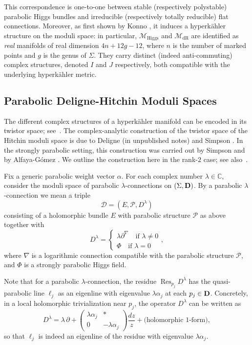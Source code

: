 \documentclass[12pt,a4paper]{amsart}
\theoremstyle{definition}
\theoremstyle{remark}
\newcommand{\C}{\mathbb C}
\newcommand{\Mcal}{\mathcal M}
\newcommand{\Pcal}{\mathcal P}
\begin{document}
This correspondence is one-to-one between stable (respectively polystable) parabolic Higgs bundles and irreducible (respectively totally reducible) flat connections.
Moreover, as first shown by Konno \cite{Konno}, it induces a hyperk\"ahler structure on the moduli space: in particular,
$\Mcal_{\mathrm{Higgs}}$ and $\Mcal_{\mathrm{dR}}$ are identified as \emph{real} manifolds
of real dimension $4n+12g-12$, where $n$ is the number of 
marked points and $g$ is the genus of $\Sigma.$ They carry distinct (indeed anti-commuting) complex structures,
denoted $I$ and $J$ respectively, both compatible with the underlying hyperk\"ahler metric.


\subsection{Parabolic Deligne-Hitchin Moduli Spaces}\label{sec:pdhms}
 The different complex structures of a hyperk\"ahler manifold can be encoded in its twistor space; see~\cite{HKLR}.
 The complex-analytic construction of the twistor space of the Hitchin moduli space is
  due to Deligne (in unpublished notes) and Simpson \cite{Sim3}. In the strongly parabolic setting, this construction was carried out by Simpson \cite{Sim21} and by Alfaya-G\'omez \cite{AlGo}. We outline the construction here in the rank-$2$ case; see also~\cite{HellerHellerTraizet2025}.

Fix a generic parabolic weight vector
$\alpha$.
For each complex number $\lambda \in \C$, consider the moduli space of parabolic $\lambda$-connections on $(\Sigma,{\bf D})$.
By a parabolic $\lambda$-connection we mean a triple \[\mathcal D=(E,\Pcal,D^\lambda)\] consisting of a holomorphic bundle $E$ with parabolic structure $\Pcal$ as above together with
\[D^\lambda=\begin{cases}\lambda \partial^\nabla \quad \text{if } \lambda\neq0\\\Phi \quad \text{if }\lambda=0\end{cases},\]
where $\nabla$ is a logarithmic connection compatible with the parabolic structure $\Pcal$, and $\Phi$ is a strongly parabolic Higgs field.

Note that for a parabolic \(\lambda\)-connection, the residue 
\(\operatorname{Res}_{p_j} D^\lambda\) has the quasi-parabolic line 
\(\ell_j\) as an eigenline with eigenvalue \(\lambda\alpha_j\) at each 
\(p_j\in{\bf D}\). Concretely, in a local holomorphic 
trivialization near \(p_j\), the operator \(D^\lambda\) can be written as
\[
D^\lambda
= \lambda\,\partial
+ \begin{pmatrix}
\lambda\alpha_j & * \\
0 & -\lambda\alpha_j
\end{pmatrix}
\frac{dz}{z}
+ \text{(holomorphic $1$-form)},
\]
so that \(\ell_j\) is indeed an eigenline of the residue with eigenvalue 
\(\lambda\alpha_j\).
\end{document}
